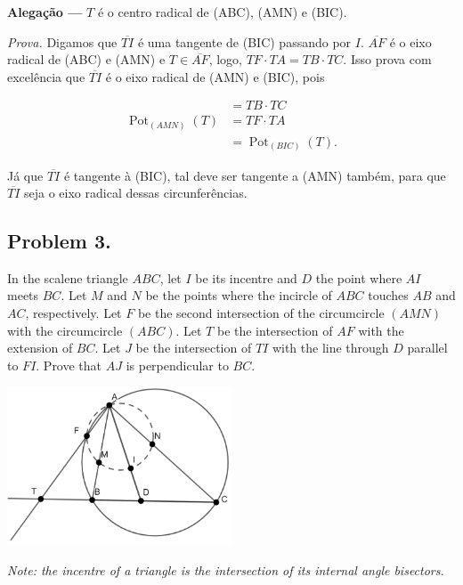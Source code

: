 \documentclass[12pt]{article}
\begin{document}
      \begin{tcolorbox}[claimbox={Claim}]
        \textbf{\sffamily\textcolor{color1}{Alegação ---}} $T$ é o centro 
        radical de (ABC), (AMN) e (BIC).
      \end{tcolorbox}

      \textit{Prova.} Digamos que $\overline{TI}$ é uma tangente de (BIC) passando por $I$.
      $\overline{AF}$ é o eixo radical de (ABC) e (AMN) e $T \in
      \overline{AF}$, logo, $TF \cdot TA = TB \cdot TC$. Isso prova com excelência
      que $\overline{TI}$ é o eixo radical de (AMN) e (BIC), pois 

      \begin{align*}
                                      &= TB \cdot TC \\
        \operatorname{Pot}_{(AMN)}(T) &= TF \cdot TA \\
                                      &= \operatorname{Pot}_{(BIC)}(T).
      \end{align*}

      Já que $\overline{TI}$ é tangente à
      (BIC), tal deve ser tangente a (AMN) também, para que $\overline{TI}$
      seja o eixo radical dessas circunferências.

    \clearpage

    \subsection{Problem 3.}
\begin{tcolorbox}[problembox={Problem Statement}]
  In the scalene triangle $ABC$, let $I$ be its incentre and $D$ the point where $AI$
  meets $BC$. Let $M$ and $N$ be the points where the incircle of $ABC$ touches $AB$
  and $AC$, respectively. Let $F$ be the second intersection of the circumcircle $(AMN)$
  with the circumcircle $(ABC)$. Let $T$ be the intersection of $AF$ with the extension
  of $BC$. Let $J$ be the intersection of $TI$ with the line through $D$ parallel to $FI$.
  Prove that $AJ$ is perpendicular to $BC$.

  \centering
    \includegraphics[width=0.5\textwidth]{third.png}

  \textit{Note: the incentre of a triangle is the intersection of its internal angle bisectors.}
\end{tcolorbox}
\end{document}
